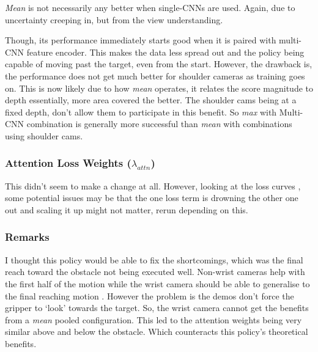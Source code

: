 \emph{Mean} is not necessarily any better when single-CNNs are used. Again, due to uncertainty creeping in, but from the view understanding.

Though, its performance immediately starts good when it is paired with multi-CNN feature encoder. This makes the data less spread out  and the policy being capable of moving past the target, even from the start. However, the drawback is, the performance does not get much better for shoulder cameras as training goes on. This is now likely due to how \emph{mean} operates, it relates the score magnitude to depth essentially, more area covered the better. The shoulder cams being at a fixed depth, don't allow them to participate in this benefit. So \emph{max} with Multi-CNN combination is generally more successful than \emph{mean} with combinations using shoulder cams.

\subsubsection{Attention Loss Weights ($\lambda_{attn}$)}
This didn't seem to make a change at all. However, looking at the loss curves , some potential issues may be that the one loss term is drowning the other one out and scaling it up might not matter, rerun depending on this.


\subsubsection{Remarks}
I thought this policy would be able to fix the shortcomings, which was the final reach toward the obstacle not being executed well. Non-wrist cameras help with the first half of the motion while the wrist camera should be able to generalise to the final reaching motion . However the problem is the demos don't force the gripper to `look' towards the target. So, the wrist camera cannot get the benefits from a \emph{mean} pooled configuration. This led to the attention weights being very similar above and below the obstacle. Which counteracts this policy's theoretical benefits.

